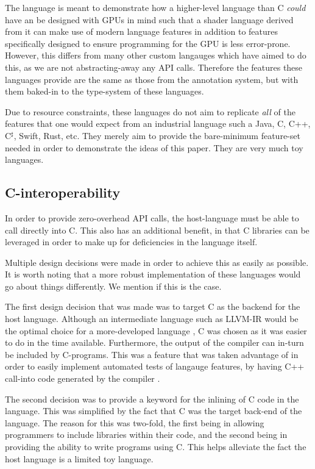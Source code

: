 \documentclass[a4paper,12pt,twoside,openright]{report}
\begin{document}
\label{sec:design_langauges}

The language is meant to demonstrate how a higher-level language than C
\textit{could} have an be designed with GPUs in mind such that a shader
language derived from it can make use of modern language features in addition
to features specifically designed to ensure programming for the GPU is less
error-prone. However, this differs from many other custom langauges which have
aimed to do this, as we are not abstracting-away any API calls. Therefore the
features these languages provide are the same as those from the annotation
system, but with them baked-in to the type-system of these languages.

Due to resource constraints, these languages do not aim to replicate
\textit{all} of the features that one would expect from an industrial language
such a Java, C, C++, C$^\sharp$, Swift, Rust, etc. They merely aim to provide
the bare-minimum feature-set needed in order to demonstrate the ideas of this
paper. They are very much toy languages.

\subsection{C-interoperability}

In order to provide zero-overhead API calls, the host-language must be able to
call directly into C. This also has an additional benefit, in that C libraries
can be leveraged in order to make up for deficiencies in the language itself.

Multiple design decisions were made in order to achieve this as easily as
possible. It is worth noting that a more robust implementation of these
languages would go about things differently. We mention if this is the case.

The first design decision that was made was to target C as the backend for the
host language. Although an intermediate language such as LLVM-IR would be the
optimal choice for a more-developed language \cite{TODO}, C was chosen as it
was easier to do in the time available. Furthermore, the output of the compiler
can in-turn be included by C-programs. This was a feature that was taken
advantage of in order to easily implement automated tests of langauge features,
by having C++ call-into code generated by the compiler \cite{AutomatedTestCode}
\cite{AutomatedTestOutput}.

The second decision was to provide a keyword for the inlining of C code in the
language. This was simplified by the fact that C was the target back-end of the
language. The reason for this was two-fold, the first being in allowing
programmers to include libraries within their code, and the second being in
providing the ability to write programs using C. This helps alleviate the fact
the host language is a limited toy language.
\end{document}

